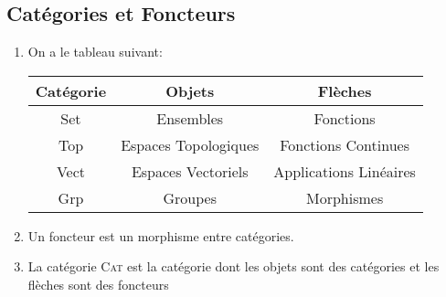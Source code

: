 \documentclass[math, info]{cours}
\begin{document}
\subsection{Catégories et Foncteurs}
\begin{enumerate}
	\item On a le tableau suivant:
	      \begin{tabular}{>{\sc}ccc}
		      \bf Catégorie & \bf Objets           & \bf Flèches            \\
		      \midrule
		      Set           & Ensembles            & Fonctions              \\
		      Top           & Espaces Topologiques & Fonctions Continues    \\
		      Vect          & Espaces Vectoriels   & Applications Linéaires \\
		      Grp           & Groupes              & Morphismes
	      \end{tabular}
	\item Un foncteur est un morphisme entre catégories.
	\item La catégorie \textsc{Cat} est la catégorie dont les objets sont des catégories et les flèches sont des foncteurs
\end{enumerate}
\end{document}
